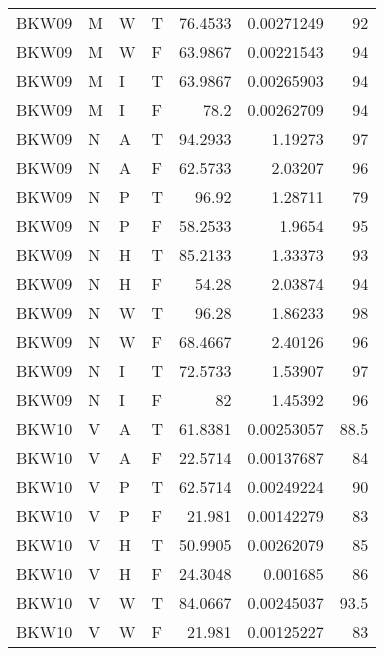 \begin{longtable}{llllrrr}
    BKW09    & M     & W     & T          & 76.4533    & 0.00271249  & 92       \\
    BKW09    & M     & W     & F          & 63.9867    & 0.00221543  & 94       \\
    BKW09    & M     & I     & T          & 63.9867    & 0.00265903  & 94       \\
    BKW09    & M     & I     & F          & 78.2       & 0.00262709  & 94       \\
    BKW09    & N     & A     & T          & 94.2933    & 1.19273     & 97       \\
    BKW09    & N     & A     & F          & 62.5733    & 2.03207     & 96       \\
    BKW09    & N     & P     & T          & 96.92      & 1.28711     & 79       \\
    BKW09    & N     & P     & F          & 58.2533    & 1.9654      & 95       \\
    BKW09    & N     & H     & T          & 85.2133    & 1.33373     & 93       \\
    BKW09    & N     & H     & F          & 54.28      & 2.03874     & 94       \\
    BKW09    & N     & W     & T          & 96.28      & 1.86233     & 98       \\
    BKW09    & N     & W     & F          & 68.4667    & 2.40126     & 96       \\
    BKW09    & N     & I     & T          & 72.5733    & 1.53907     & 97       \\
    BKW09    & N     & I     & F          & 82         & 1.45392     & 96       \\
    BKW10    & V     & A     & T          & 61.8381    & 0.00253057  & 88.5     \\
    BKW10    & V     & A     & F          & 22.5714    & 0.00137687  & 84       \\
    BKW10    & V     & P     & T          & 62.5714    & 0.00249224  & 90       \\
    BKW10    & V     & P     & F          & 21.981     & 0.00142279  & 83       \\
    BKW10    & V     & H     & T          & 50.9905    & 0.00262079  & 85       \\
    BKW10    & V     & H     & F          & 24.3048    & 0.001685    & 86       \\
    BKW10    & V     & W     & T          & 84.0667    & 0.00245037  & 93.5     \\
    BKW10    & V     & W     & F          & 21.981     & 0.00125227  & 83       \\

\end{longtable}
